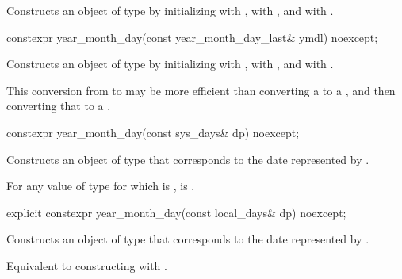 \begin{itemdescr}
\pnum
\effects
Constructs an object of type  by
initializing
 with ,
 with , and
 with .
\end{itemdescr}

%
\begin{itemdecl}
constexpr year_month_day(const year_month_day_last& ymdl) noexcept;
\end{itemdecl}

\begin{itemdescr}
\pnum
\effects
Constructs an object of type  by
initializing
 with ,
 with , and
 with .
\begin{note}
This conversion from  to 
may be more efficient than converting a  to a ,
and then converting that  to a .
\end{note}
\end{itemdescr}

%
\begin{itemdecl}
constexpr year_month_day(const sys_days& dp) noexcept;
\end{itemdecl}

\begin{itemdescr}
\pnum
\effects
Constructs an object of type 
that corresponds to the date represented by .

\pnum
\remarks
For any value  of type 
for which  is ,
is .
\end{itemdescr}

%
\begin{itemdecl}
explicit constexpr year_month_day(const local_days& dp) noexcept;
\end{itemdecl}

\begin{itemdescr}
\pnum
\effects
Constructs an object of type 
that corresponds to the date represented by .

\pnum
\remarks
Equivalent to constructing with .
\end{itemdescr}


